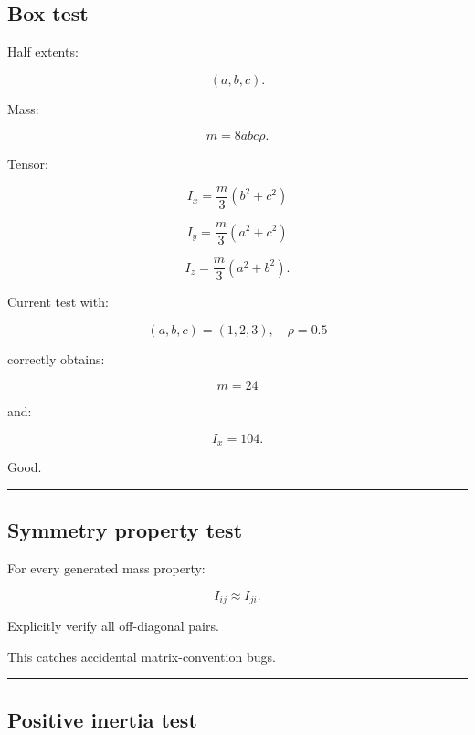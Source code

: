 \subsection{Box test}\label{06-engine-ii-ch039-box-test}

\hypertarget{06-engine-ii-ch039-box-test}{}

Half extents:

\[
(a,b,c).
\]

Mass:

\[
m=8abc\rho.
\]

Tensor:

\[
I_x
=
\frac m3(b^2+c^2)
\]

\[
I_y
=
\frac m3(a^2+c^2)
\]

\[
I_z
=
\frac m3(a^2+b^2).
\]

Current test with:

\[
(a,b,c)=(1,2,3),
\quad
\rho=0.5
\]

correctly obtains:

\[
m=24
\]

and:

\[
I_x=104.
\]

Good.

\begin{center}\rule{0.5\linewidth}{0.5pt}\end{center}

\subsection{Symmetry property test}\label{06-engine-ii-ch039-symmetry-property-test}

\hypertarget{06-engine-ii-ch039-symmetry-property-test}{}

For every generated mass property:

\[
\boxed{
I_{ij}\approx I_{ji}.
}
\]

Explicitly verify all off-diagonal pairs.

This catches accidental matrix-convention bugs.

\begin{center}\rule{0.5\linewidth}{0.5pt}\end{center}

\subsection{Positive inertia test}\label{06-engine-ii-ch039-positive-inertia-test}

\hypertarget{06-engine-ii-ch039-positive-inertia-test}{}

